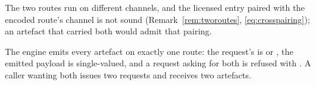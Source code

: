 
The two routes run on different channels, and the licensed entry paired with
the encoded route's channel is not sound (Remark~\ref{rem:tworoutes},
\eqref{eq:crosspairing}); an artefact that carried both would admit that
pairing.

\begin{requirement}
\label{req:one-route-per-artifact}
The engine emits every artefact on exactly one route: the request's
 is  or , the emitted payload is
single-valued, and a request asking for both is refused with
. A caller wanting both issues two requests and
receives two artefacts.
\end{requirement}
